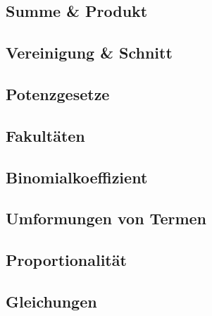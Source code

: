 \subsection{Summe \& Produkt}\label{subsec:rechnen_summe-und-produkt}


\subsection{Vereinigung \& Schnitt}\label{subsec:rechnen_vereinigung-und-schnitt}


\subsection{Potenzgesetze}\label{subsec:rechnen_potenzgesetze}


\subsection{Fakultäten}\label{subsec:rechnen_fakultaten}


\subsection{Binomialkoeffizient}\label{subsec:rechnen_binominialkoeffizient}


\subsection{Umformungen von Termen}\label{subsec:rechnen_umformungen-von-termen}


\subsection{Proportionalität}\label{subsec:rechnen_proportionalitat}


\subsection{Gleichungen}\label{subsec:rechnen_gleichungen}

